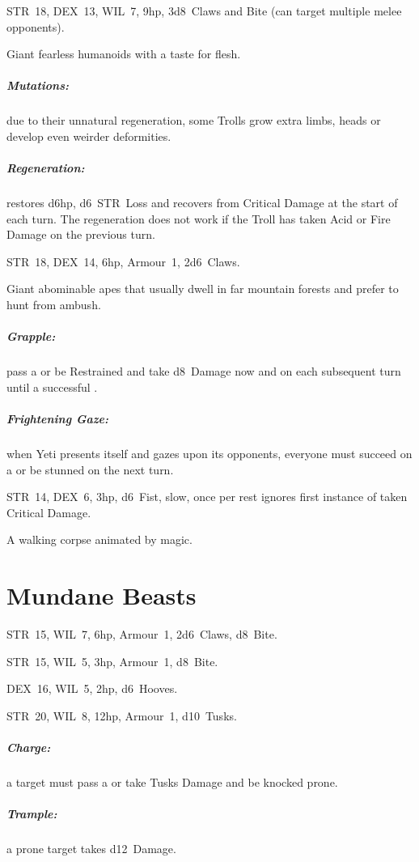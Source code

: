 \documentclass[itdr]{subfiles}
\begin{document}
\vfill

STR~18, DEX~13, WIL~7, 9hp, 3d8~Claws and Bite (can target multiple melee opponents).

Giant fearless humanoids with a taste for flesh.

\subparagraph{Mutations:} due to their unnatural regeneration, some Trolls grow extra limbs, heads or develop even weirder deformities.

\subparagraph{Regeneration:} restores d6hp, d6~STR~Loss and recovers from Critical Damage at the start of each turn. The regeneration does not work if the Troll has taken Acid or Fire Damage on the previous turn.

\vfill

STR~18, DEX~14, 6hp, Armour~1, 2d6~Claws.

Giant abominable apes that usually dwell in far mountain forests and prefer to hunt from ambush.

\subparagraph{Grapple:} pass a  or be Restrained and take d8~Damage now and on each subsequent turn until a successful .

\subparagraph{Frightening Gaze:} when Yeti presents itself and gazes upon its opponents, everyone must succeed on a  or be stunned on the next turn.

\vfill

STR~14, DEX~6, 3hp, d6~Fist, slow, once per rest \mbox{ignores} first instance of taken Critical Damage.

A walking corpse animated by magic.


\vfill
\break

\section{Mundane Beasts}

STR~15, WIL~7, 6hp, Armour~1, 2d6~Claws, d8~Bite.

\vfill

STR~15, WIL~5, 3hp, Armour~1, d8~Bite.

\vfill

DEX~16, WIL~5, 2hp, d6~Hooves.

\vfill

STR~20, WIL~8, 12hp, Armour~1, d10~Tusks.
\subparagraph{Charge:} a target must pass a  or take Tusks Damage and be knocked prone.
\subparagraph{Trample:} a prone target takes d12~Damage.
\end{document}
